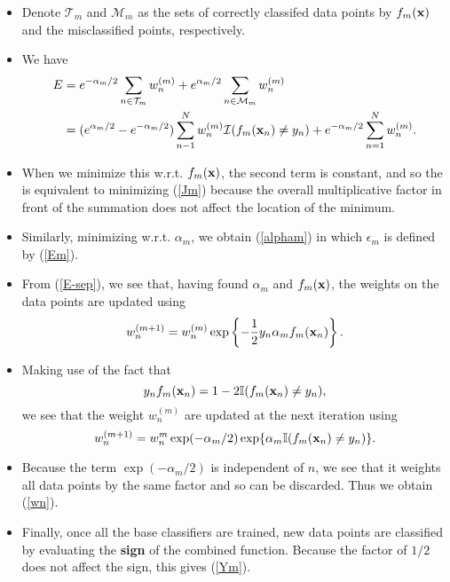\documentclass{beamer}
\def\bfx{{\bf x}}
\begin{document}
                     \begin{frame}{}
                     \begin{itemize}\small
                      \item Denote $\mathcal{T}_m$ and $\mathcal{M}_m$ as the sets of correctly classifed data points by $f_m(\bfx)$ and the misclassified points, respectively.
                      \item We have
                      \begin{align}
                      E&=e^{-\alpha_m/2}\sum_{n\in \mathcal{T}_m}w_n^{(m)} + e^{\alpha_m/2}\sum_{n\in \mathcal{M}_m} w_n^{(m)}\nonumber\\
                      &=(e^{\alpha_m/2} - e^{-\alpha_m/2})\sum^N_{n-1}w_n^{(m)}\mathcal{I}(f_m(\bfx_n)\ne y_n) + e^{-\alpha_m/2}\sum^N_{n=1}w_n^{(m)}.
                      \end{align}
                      \item When we minimize this w.r.t. $f_m(\bfx)$, the second term is constant, and so the is equivalent to minimizing (\ref{Jm}) because the overall multiplicative factor in front of the summation does not affect the location of the minimum.
                      \item Similarly, minimizing w.r.t. $\alpha_m$, we obtain (\ref{alpham}) in which $\epsilon_m$ is defined by (\ref{Em}).
                     \end{itemize}
                     \end{frame}

                     \begin{frame}{}
                     \begin{itemize}
                     \item From (\ref{E-sep}), we see that, having found $\alpha_m$ and $f_m(\bfx)$, the weights on the data points are updated using
                     $$w_n^{(m+1)} = w_n^{(m)}\exp\left\{-\frac{1}{2} y_n \alpha_m f_m(\bfx_n)\right\}.$$
                     \item Making use of the fact that
                     $$y_n f_m(\bfx_n) = 1-2\mathbb{I}(f_m(\bfx_n) \ne y_n),$$
                     we see that the weight $w_n^{(m)}$ are updated at the next iteration using
                     $$w_n^{(m+1)} = w_n^{m}\exp(-\alpha_m/2)\exp \{\alpha_m \mathbb{I}(f_m(\bfx_n) \ne y_n)\}.$$
                     \item Because the term $\exp(-\alpha_m/2)$ is independent of $n$, we see that it weights all data points by the same factor and so can be discarded. Thus we obtain (\ref{wn}).
                     \item Finally, once all the base classifiers are trained, new data points are classified by evaluating the \textbf{sign} of the combined function. Because the factor of $1/2$ does not affect the sign, this gives (\ref{Ym}). 
                     \end{itemize}
                     \end{frame}
\end{document}
